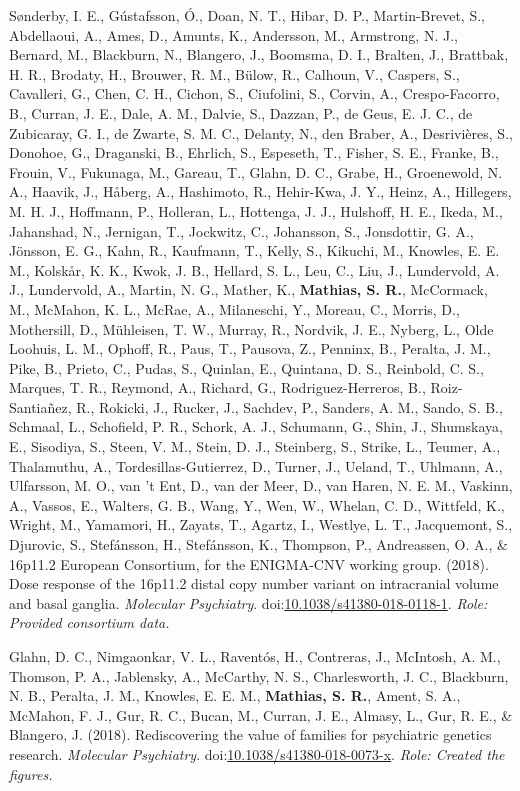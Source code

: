 \documentclass[10pt]{article}
\makeatletter
\newlength{\bibhang}
\newlength{\bibsep}
 {\@listi \global\bibsep\itemsep \global\advance\bibsep by\parsep}
\newenvironment{bibsection}%
        {\vspace{-\baselineskip}\begin{list}{}{%
       \setlength{\leftmargin}{\bibhang}%
       \setlength{\itemindent}{-\leftmargin}%
       \setlength{\itemsep}{\bibsep}%
       \setlength{\parsep}{\z@}%
        \setlength{\partopsep}{0pt}%
        \setlength{\topsep}{0pt}}}
        {\end{list}\vspace{-.6\baselineskip}}
\newcommand\doilink[1]{\href{http://dx.doi.org/#1}{#1}}
\newcommand\doi[1]{doi:\doilink{#1}}
\makeatother
\begin{document}
\begin{bibsection}
\item Sønderby, I. E., Gústafsson, Ó., Doan, N. T., Hibar, D. P., Martin-Brevet, S., Abdellaoui, A., Ames, D., Amunts, K., Andersson, M., Armstrong, N. J., Bernard, M., Blackburn, N., Blangero, J., Boomsma, D. I., Bralten, J., Brattbak, H. R., Brodaty, H., Brouwer, R. M., Bülow, R., Calhoun, V., Caspers, S., Cavalleri, G., Chen, C. H., Cichon, S., Ciufolini, S., Corvin, A., Crespo-Facorro, B., Curran, J. E., Dale, A. M., Dalvie, S., Dazzan, P., de Geus, E. J. C., de Zubicaray, G. I., de Zwarte, S. M. C., Delanty, N., den Braber, A., Desrivières, S., Donohoe, G., Draganski, B., Ehrlich, S., Espeseth, T., Fisher, S. E., Franke, B., Frouin, V., Fukunaga, M., Gareau, T., Glahn, D. C., Grabe, H., Groenewold, N. A., Haavik, J., Håberg, A., Hashimoto, R., Hehir-Kwa, J. Y., Heinz, A., Hillegers, M. H. J., Hoffmann, P., Holleran, L., Hottenga, J. J., Hulshoff, H. E., Ikeda, M., Jahanshad, N., Jernigan, T., Jockwitz, C., Johansson, S., Jonsdottir, G. A., Jönsson, E. G., Kahn, R., Kaufmann, T., Kelly, S., Kikuchi, M., Knowles, E. E. M., Kolskår, K. K., Kwok, J. B., Hellard, S. L., Leu, C., Liu, J., Lundervold, A. J., Lundervold, A., Martin, N. G., Mather, K., \textbf{Mathias, S. R.}, McCormack, M., McMahon, K. L., McRae, A., Milaneschi, Y., Moreau, C., Morris, D., Mothersill, D., Mühleisen, T. W., Murray, R., Nordvik, J. E., Nyberg, L., Olde Loohuis, L. M., Ophoff, R., Paus, T., Pausova, Z., Penninx, B., Peralta, J. M., Pike, B., Prieto, C., Pudas, S., Quinlan, E., Quintana, D. S., Reinbold, C. S., Marques, T. R., Reymond, A., Richard, G., Rodriguez-Herreros, B., Roiz-Santiañez, R., Rokicki, J., Rucker, J., Sachdev, P., Sanders, A. M., Sando, S. B., Schmaal, L., Schofield, P. R., Schork, A. J., Schumann, G., Shin, J., Shumskaya, E., Sisodiya, S., Steen, V. M., Stein, D. J., Steinberg, S., Strike, L., Teumer, A., Thalamuthu, A., Tordesillas-Gutierrez, D., Turner, J., Ueland, T., Uhlmann, A., Ulfarsson, M. O., van 't Ent, D., van der Meer, D., van Haren, N. E. M., Vaskinn, A., Vassos, E., Walters, G. B., Wang, Y., Wen, W., Whelan, C. D., Wittfeld, K., Wright, M., Yamamori, H., Zayats, T., Agartz, I., Westlye, L. T., Jacquemont, S., Djurovic, S., Stefánsson, H., Stefánsson, K., Thompson, P., Andreassen, O. A., \& 16p11.2 European Consortium, for the ENIGMA-CNV working group. (2018). Dose response of the 16p11.2 distal copy number variant on intracranial volume and basal ganglia. \emph{Molecular Psychiatry}. \doi{10.1038/s41380-018-0118-1}. \emph{Role: Provided consortium data.}

\item Glahn, D. C., Nimgaonkar, V. L., Raventós, H., Contreras, J., McIntosh, A. M., Thomson, P. A., Jablensky, A., McCarthy, N. S., Charlesworth, J. C., Blackburn, N. B., Peralta, J. M., Knowles, E. E. M., \textbf{Mathias, S. R.}, Ament, S. A., McMahon, F. J., Gur, R. C., Bucan, M., Curran, J. E., Almasy, L., Gur, R. E., \& Blangero, J. (2018). Rediscovering the value of families for psychiatric genetics research. \emph{Molecular Psychiatry}. \doi{10.1038/s41380-018-0073-x}. \emph{Role: Created the figures.}


\end{bibsection}
\end{document}
